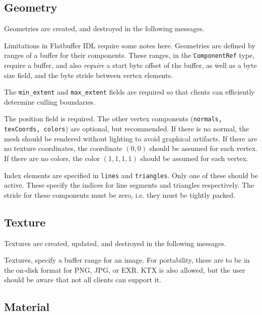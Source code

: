 \documentclass[11pt, oneside]{amsart}
\begin{document}
\subsection{Geometry}

Geometries are created, and destroyed in the following messages.



Limitations in Flatbuffer IDL require some notes here. Geometries are defined by ranges of a buffer for their components. These ranges, in the \texttt{ComponentRef} type, require a buffer, and also \textit{require} a start byte offset of the buffer, as well as a byte size field, and the byte stride between vertex elements.

The \texttt{min\_extent} and \texttt{max\_extent} fields are required so that clients can efficiently determine culling boundaries.

The position field is required. The other vertex components (\texttt{normals, texCoords, colors}) are optional, but recommended. If there is no normal, the mesh should be rendered without lighting to avoid graphical artifacts. If there are no texture coordinates, the coordinate $(0,0)$ should be assumed for each vertex. If there are no colors, the color $(1,1,1,1)$ should be assumed for each vertex.

Index elements are specified in \texttt{lines} and \texttt{triangles}. Only one of these should be active. These specify the indices for line segments and triangles respectively. The stride for these components must be zero, i.e. they must be tightly packed.

\subsection{Texture}

Textures are created, updated, and destroyed in the following messages.



Textures, specify a buffer range for an image. For portability, these are to be in the on-disk format for PNG, JPG, or EXR. KTX is also allowed, but the user should be aware that not all clients can support it.

\subsection{Material}
\end{document}
